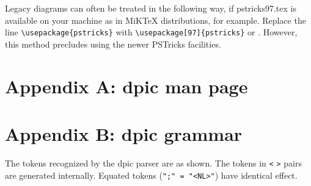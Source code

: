 \documentclass[11pt]{article}
\begin{document}
  Legacy diagrams can often be treated in the following way, if pstricks97.tex
  is available on your machine as in MiKTeX distributions, for example.
  Replace the line \verb|\usepackage{pstricks}| with
  \verb|\usepackage[97]{pstricks}| or \verb||.
  However, this method precludes using the newer PSTricks facilities.




\clearpage
\section{Appendix A: dpic man page}
%

\clearpage
\section{Appendix B: dpic grammar}
The tokens recognized by the dpic parser are as shown.  The tokens
in {\tt <} {\tt >} pairs are generated internally.  Equated tokens
({\tt ";" = "<NL>"}) have identical effect.
\end{document}
